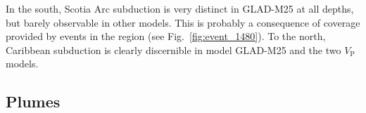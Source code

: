 In the south,
Scotia Arc subduction is very distinct in GLAD-M25 at all depths,
but barely observable in other models.
This is probably a consequence of coverage provided by events in the region (see Fig.~\ref{fig:event_1480}).
To the north,
Caribbean subduction is clearly discernible in model GLAD-M25 and the two $V_\textrm{P}$ models.

\subsection{Plumes}
\label{section:plumes}

\begin{figure}[ht!]
    \centering
    \\[-1pt]
    \\[-1pt]
    \\[-1pt]
    \\[-1pt]
    \\[-1pt]

\end{figure}
